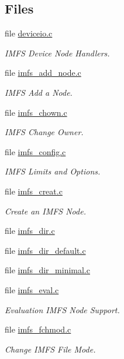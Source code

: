 \subsection*{Files}
\begin{DoxyCompactItemize}
\item 
file \mbox{\hyperlink{deviceio_8c}{deviceio.\+c}}
\begin{DoxyCompactList}\small\item\em I\+M\+FS Device Node Handlers. \end{DoxyCompactList}\item 
file \mbox{\hyperlink{imfs__add__node_8c}{imfs\+\_\+add\+\_\+node.\+c}}
\begin{DoxyCompactList}\small\item\em I\+M\+FS Add a Node. \end{DoxyCompactList}\item 
file \mbox{\hyperlink{imfs__chown_8c}{imfs\+\_\+chown.\+c}}
\begin{DoxyCompactList}\small\item\em I\+M\+FS Change Owner. \end{DoxyCompactList}\item 
file \mbox{\hyperlink{imfs__config_8c}{imfs\+\_\+config.\+c}}
\begin{DoxyCompactList}\small\item\em I\+M\+FS Limits and Options. \end{DoxyCompactList}\item 
file \mbox{\hyperlink{imfs__creat_8c}{imfs\+\_\+creat.\+c}}
\begin{DoxyCompactList}\small\item\em Create an I\+M\+FS Node. \end{DoxyCompactList}\item 
file \mbox{\hyperlink{imfs__dir_8c}{imfs\+\_\+dir.\+c}}
\item 
file \mbox{\hyperlink{imfs__dir__default_8c}{imfs\+\_\+dir\+\_\+default.\+c}}
\item 
file \mbox{\hyperlink{imfs__dir__minimal_8c}{imfs\+\_\+dir\+\_\+minimal.\+c}}
\item 
file \mbox{\hyperlink{imfs__eval_8c}{imfs\+\_\+eval.\+c}}
\begin{DoxyCompactList}\small\item\em Evaluation I\+M\+FS Node Support. \end{DoxyCompactList}\item 
file \mbox{\hyperlink{imfs__fchmod_8c}{imfs\+\_\+fchmod.\+c}}
\begin{DoxyCompactList}\small\item\em Change I\+M\+FS File Mode. \end{DoxyCompactList}\item 

\end{DoxyCompactItemize}
